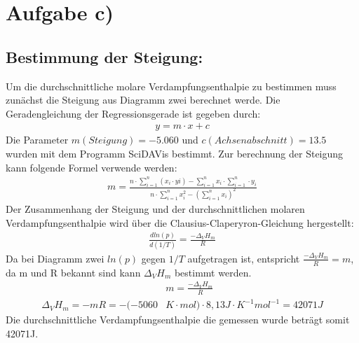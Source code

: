 \section{Aufgabe c)}
\subsection{Bestimmung der Steigung:}
Um die durchschnittliche molare Verdampfungsenthalpie zu bestimmen muss zunächst die Steigung aus 
Diagramm zwei berechnet werde.
Die Geradengleichung der Regressionsgerade ist gegeben durch:
\begin{align*}
    y = m \cdot x + c
\end{align*} 
Die Parameter $m(Steigung)=-5.060$ und $c(Achsenabschnitt)=13.5$ wurden mit dem Programm SciDAVis bestimmt. Zur berechnung 
der Steigung kann folgende Formel verwende werden:
\begin{align*}
    m = \frac{n \cdot \sum\limits^{n}_{i=1}(x_i \cdot yi) - \sum\limits^{n}_{i=1}x_i \cdot \sum\limits^{n}_{i=1} \cdot y_i} 
    {n \cdot \sum\limits^{n}_{i=1}x_i^2-(\sum\limits^{n}_{i=1}x_i)^2}
\end{align*} 
Der Zusammenhang der Steigung und der durchschnittlichen molaren Verdampfungsenthalpie wird über die 
Clausius-Claperyron-Gleichung hergestellt:
\begin{align*}
    \frac{d ln (p)}{d(1/T)} = \frac{-\Delta_V H_m}{R}
\end{align*}
Da bei Diagramm zwei $ln(p)$ gegen $1/T$ aufgetragen ist, entspricht $\frac{-\Delta_V H_m}{R}=m$, da m und R bekannt
sind kann $\Delta_V H_m$ bestimmt werden.
\begin{align*}
    &m = \frac{-\Delta_V H_m}{R} \\
    \Delta_V H_m = - m R = - (-5060 &K \cdot mol) \cdot 8,13 J \cdot K^{-1}  mol^{-1} = 42071J  
\end{align*} 
Die durchschnittliche Verdampfungsenthalpie die gemessen wurde beträgt somit 42071J.